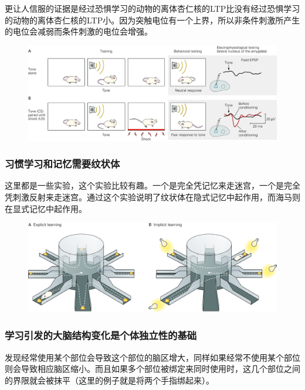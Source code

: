 \documentclass[UTF8,nofonts]{ctexart}
\begin{document}
\par
更让人信服的证据是经过恐惧学习的动物的离体杏仁核的LTP比没有经过恐惧学习的动物的离体杏仁核的LTP小。因为突触电位有一个上界，所以非条件刺激所产生的电位会减弱而条件刺激的电位会增强。
\begin{figure}[h]
	\centering
	\includegraphics[scale=0.9]{Pic/6613_PNS5.jpg}
\end{figure}
\subsubsection{习惯学习和记忆需要纹状体}
这里都是一些实验，这个实验比较有趣。一个是完全凭记忆来走迷宫，一个是完全凭刺激反射来走迷宫。通过这个实验说明了纹状体在隐式记忆中起作用，而海马则在显式记忆中起作用。
\newline
\begin{figure}[h]
	\centering
	\includegraphics[scale=0.9]{Pic/6615_PNS5.jpg}
\end{figure}

\subsubsection{学习引发的大脑结构变化是个体独立性的基础}
发现经常使用某个部位会导致这个部位的脑区增大，同样如果经常不使用某个部位则会导致相应脑区缩小。而且如果多个部位被绑定来同时使用时，这几个部位之间的界限就会被抹平（这里的例子就是将两个手指绑起来）。
\end{document}
